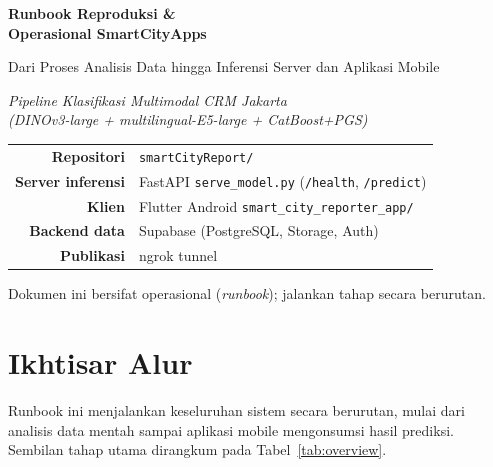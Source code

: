 \documentclass[11pt,a4paper]{article}
\newcommand{\code}[1]{\texttt{\small #1}}
\begin{document}
\begin{titlepage}
\centering
\vspace*{2.2cm}
{\Huge\bfseries\color{accent} Runbook Reproduksi \&\\[0.25em] Operasional SmartCityApps\par}
\vspace{0.8cm}
{\large Dari Proses Analisis Data hingga Inferensi Server dan Aplikasi Mobile\par}
\vspace{0.4cm}
{\large\itshape Pipeline Klasifikasi Multimodal CRM Jakarta\\(DINOv3-large + multilingual-E5-large + CatBoost+PGS)\par}
\vfill
\begin{tabular}{rl}
\textbf{Repositori} & \code{smartCityReport/}\\
\textbf{Server inferensi} & FastAPI \code{serve\_model.py} (\code{/health}, \code{/predict})\\
\textbf{Klien} & Flutter Android \code{smart\_city\_reporter\_app/}\\
\textbf{Backend data} & Supabase (PostgreSQL, Storage, Auth)\\
\textbf{Publikasi} & ngrok tunnel\\
\end{tabular}
\vspace{1.2cm}

{\small Dokumen ini bersifat operasional (\emph{runbook}); jalankan tahap secara berurutan.}
\vfill
\end{titlepage}

\tableofcontents
\newpage

\section{Ikhtisar Alur}
Runbook ini menjalankan keseluruhan sistem secara berurutan, mulai dari analisis
data mentah sampai aplikasi mobile mengonsumsi hasil prediksi. Sembilan tahap
utama dirangkum pada Tabel~\ref{tab:overview}.
\end{document}
